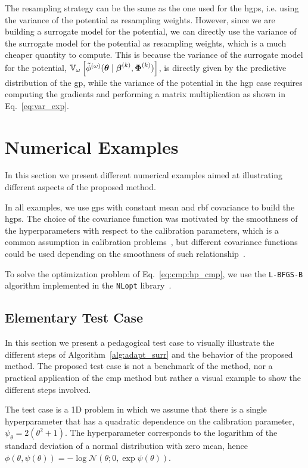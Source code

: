\smallskip
The resampling strategy can be the same as the one used for the \glspl{hgp}, i.e. using the variance of the potential as resampling weights. However, since we are building a surrogate model for the potential, we can directly use the variance of the surrogate model for the potential as resampling weights, which is a much cheaper quantity to compute. This is because the variance of the surrogate model for the potential, $\mathbb{V}_{\omega} \left[ \tilde{\phi}^{(\omega)}(\boldsymbol{\theta} \mid \boldsymbol{\beta}^{(k)}, \boldsymbol{\Phi}^{(k)}) \right]$, is directly given by the predictive distribution of the \gls{gp}, while the variance of the potential in the \gls{hgp} case requires computing the gradients and performing a matrix multiplication as shown in Eq.~\eqref{eq:var_exp}.

\section{Numerical Examples}
\label{sc:surr:examples}
In this section we present different numerical examples aimed at illustrating different aspects of the proposed method.

\smallskip
In all examples, we use \glspl{gp} with constant mean and \gls{rbf} covariance to build the \glspl{hgp}. The choice of the covariance function was motivated by the smoothness of the hyperparameters with respect to the calibration parameters, which is a common assumption in calibration problems~\cite{cmp}, but different covariance functions could be used depending on the smoothness of such relationship~\cite{gp_rasmussen}.

\smallskip
To solve the optimization problem of Eq.~\eqref{eq:cmp:hp_cmp}, we use the \texttt{L-BFGS-B} algorithm implemented in the \texttt{NLopt} library~\cite{nlopt}.

\subsection{Elementary Test Case}
\label{sc:surr:el_test}

In this section we present a pedagogical test case to visually illustrate the different steps of Algorithm~\ref{alg:adapt_surr} and the behavior of the proposed method. The proposed test case is not a benchmark of the method, nor a practical application of the \gls{cmp} method but rather a visual example to show the different steps involved.

The test case is a 1D problem in which we assume that there is a single hyperparameter that has a quadratic dependence on the calibration parameter, $\psi_{\theta} = 2(\theta^2 + 1)$. The hyperparameter corresponds to the logarithm of the standard deviation of a normal distribution with zero mean, hence $\phi(\theta, \psi(\theta)) = -\log \mathcal{N}(\theta; 0, \exp \psi(\theta))$.

